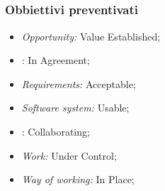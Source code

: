 \subsection{\fPDt}\label{resocontoSEMAT2}
\subsubsection{Obbiettivi preventivati}
\begin{itemize}
\item \textit{Opportunity:} Value Established;
\item {}: In Agreement;
\item \textit{Requirements:} Acceptable;
\item \textit{Software system:} Usable;
\item {}: Collaborating;
\item \textit{Work:} Under Control;
\item \textit{Way of working:} In Place;
\end{itemize}
